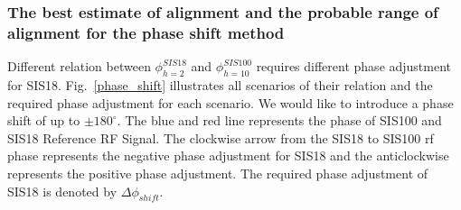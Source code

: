 \subsubsection{The best estimate of alignment and the probable range of alignment for the phase shift method}
Different relation between $\phi_{h=2}^{SIS18}$ and $\phi_{h=10}^{SIS100}$ requires different phase adjustment for SIS18. Fig.~\ref{phase_shift} illustrates all scenarios of their relation and the required phase adjustment for each scenario. We would like to introduce a phase shift of up to $\pm 180^\circ$. The blue and red line represents the phase of SIS100 and SIS18 Reference RF Signal. The clockwise arrow from the SIS18 to SIS100 rf phase represents the negative phase adjustment for SIS18 and the anticlockwise represents the positive phase adjustment. The required phase adjustment of SIS18 is denoted by $\Delta \phi_{shift}$.



